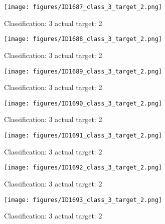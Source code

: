 \begin{figure}[h!]
\begin{center}
\texttt{[image: figures/ID1687\_class\_3\_target\_2.png]}
\end{center}
\caption{ Classification: 3 actual target: 2}
\label{fig:ID1687_class_3_target_2}
\end{figure}
\begin{figure}[h!]
\begin{center}
\texttt{[image: figures/ID1688\_class\_3\_target\_2.png]}
\end{center}
\caption{ Classification: 3 actual target: 2}
\label{fig:ID1688_class_3_target_2}
\end{figure}
\begin{figure}[h!]
\begin{center}
\texttt{[image: figures/ID1689\_class\_3\_target\_2.png]}
\end{center}
\caption{ Classification: 3 actual target: 2}
\label{fig:ID1689_class_3_target_2}
\end{figure}
\begin{figure}[h!]
\begin{center}
\texttt{[image: figures/ID1690\_class\_3\_target\_2.png]}
\end{center}
\caption{ Classification: 3 actual target: 2}
\label{fig:ID1690_class_3_target_2}
\end{figure}
\begin{figure}[h!]
\begin{center}
\texttt{[image: figures/ID1691\_class\_3\_target\_2.png]}
\end{center}
\caption{ Classification: 3 actual target: 2}
\label{fig:ID1691_class_3_target_2}
\end{figure}
\begin{figure}[h!]
\begin{center}
\texttt{[image: figures/ID1692\_class\_3\_target\_2.png]}
\end{center}
\caption{ Classification: 3 actual target: 2}
\label{fig:ID1692_class_3_target_2}
\end{figure}
\begin{figure}[h!]
\begin{center}
\texttt{[image: figures/ID1693\_class\_3\_target\_2.png]}
\end{center}
\caption{ Classification: 3 actual target: 2}
\label{fig:ID1693_class_3_target_2}
\end{figure}
